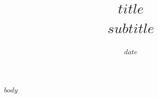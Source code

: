 \documentclass[11pt,a4paper]{article}
\title{\textbf{$title$}\\[6pt]\large $subtitle$}
\author{}\date{$date$}
\begin{document}
\maketitle
\thispagestyle{fancy}
\tableofcontents
\clearpage
$body$
\end{document}
